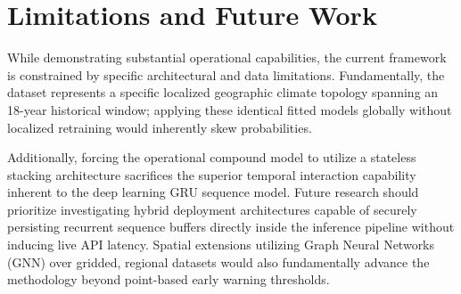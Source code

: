 \section{Limitations and Future Work}
\label{sec:limitations}
While demonstrating substantial operational capabilities, the current framework is constrained by specific architectural and data limitations. Fundamentally, the dataset represents a specific localized geographic climate topology spanning an 18-year historical window; applying these identical fitted models globally without localized retraining would inherently skew probabilities. 

Additionally, forcing the operational compound model to utilize a stateless stacking architecture sacrifices the superior temporal interaction capability inherent to the deep learning GRU sequence model. Future research should prioritize investigating hybrid deployment architectures capable of securely persisting recurrent sequence buffers directly inside the inference pipeline without inducing live API latency. Spatial extensions utilizing Graph Neural Networks (GNN) over gridded, regional datasets would also fundamentally advance the methodology beyond point-based early warning thresholds.
